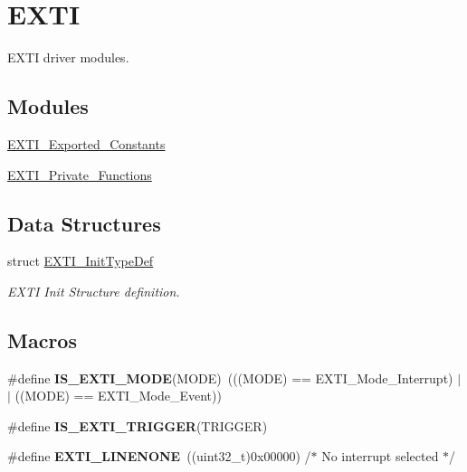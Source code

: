 \hypertarget{group___e_x_t_i}{\section{E\-X\-T\-I}
\label{group___e_x_t_i}
}


E\-X\-T\-I driver modules.  


\subsection*{Modules}
\begin{DoxyCompactItemize}
\item 
\hyperlink{group___e_x_t_i___exported___constants}{E\-X\-T\-I\-\_\-\-Exported\-\_\-\-Constants}
\item 
\hyperlink{group___e_x_t_i___private___functions}{E\-X\-T\-I\-\_\-\-Private\-\_\-\-Functions}
\end{DoxyCompactItemize}
\subsection*{Data Structures}
\begin{DoxyCompactItemize}
\item 
struct \hyperlink{struct_e_x_t_i___init_type_def}{E\-X\-T\-I\-\_\-\-Init\-Type\-Def}
\begin{DoxyCompactList}\small\item\em E\-X\-T\-I Init Structure definition. \end{DoxyCompactList}\end{DoxyCompactItemize}
\subsection*{Macros}
\begin{DoxyCompactItemize}
\item 
\hypertarget{group___e_x_t_i_ga8429170f3320b90227f9f5b252c1c5eb}{\#define {\bfseries I\-S\-\_\-\-E\-X\-T\-I\-\_\-\-M\-O\-D\-E}(M\-O\-D\-E)~(((M\-O\-D\-E) == E\-X\-T\-I\-\_\-\-Mode\-\_\-\-Interrupt) $|$$|$ ((M\-O\-D\-E) == E\-X\-T\-I\-\_\-\-Mode\-\_\-\-Event))}\label{group___e_x_t_i_ga8429170f3320b90227f9f5b252c1c5eb}

\item 
\#define {\bfseries I\-S\-\_\-\-E\-X\-T\-I\-\_\-\-T\-R\-I\-G\-G\-E\-R}(T\-R\-I\-G\-G\-E\-R)
\item 
\hypertarget{group___e_x_t_i_ga4451b67e337fc341394ee695273798af}{\#define {\bfseries E\-X\-T\-I\-\_\-\-L\-I\-N\-E\-N\-O\-N\-E}~((uint32\-\_\-t)0x00000)  /$\ast$ No interrupt selected $\ast$/}\label{group___e_x_t_i_ga4451b67e337fc341394ee695273798af}

\end{DoxyCompactItemize}
